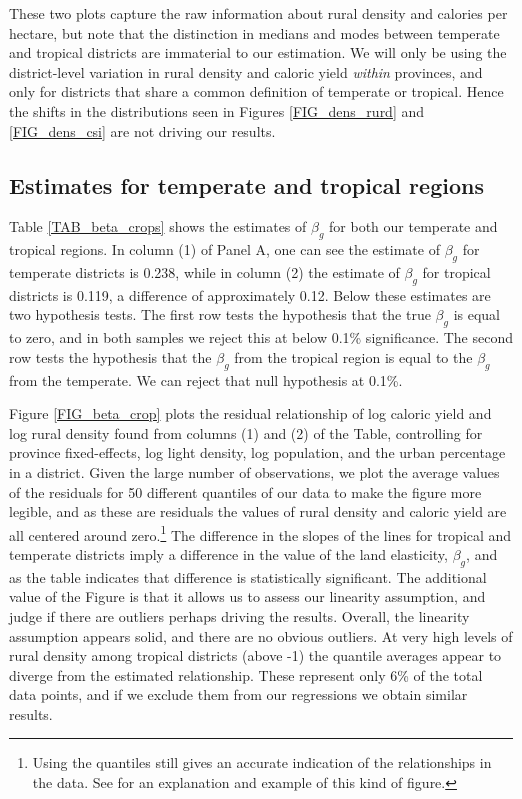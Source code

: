 \documentclass[11pt]{article}
\begin{document}
These two plots capture the raw information about rural density and calories per hectare, but note that the distinction in medians and modes between temperate and tropical districts are immaterial to our estimation. We will only be using the district-level variation in rural density and caloric yield \textit{within} provinces, and only for districts that share a common definition of temperate or tropical. Hence the shifts in the distributions seen in Figures \ref{FIG_dens_rurd} and \ref{FIG_dens_csi} are not driving our results. 

\subsection{Estimates for temperate and tropical regions}
Table \ref{TAB_beta_crops} shows the estimates of $\beta_g$ for both our temperate and tropical regions. In column (1) of Panel A, one can see the estimate of $\beta_g$ for temperate districts is 0.238, while in column (2) the estimate of $\beta_g$ for tropical districts is 0.119, a difference of approximately 0.12. Below these estimates are two hypothesis tests. The first row tests the hypothesis that the true $\beta_g$ is equal to zero, and in both samples we reject this at below 0.1\% significance. The second row tests the hypothesis that the $\beta_g$ from the tropical region is equal to the $\beta_g$ from the temperate. We can reject that null hypothesis at 0.1\%.

Figure \ref{FIG_beta_crop} plots the residual relationship of log caloric yield and log rural density found from columns (1) and (2) of the Table, controlling for province fixed-effects, log light density, log population, and the urban percentage in a district. Given the large number of observations, we plot the average values of the residuals for 50 different quantiles of our data to make the figure more legible, and as these are residuals the values of rural density and caloric yield are all centered around zero.\footnote{Using the quantiles still gives an accurate indication of the relationships in the data. See \citet{cfs2013} for an explanation and example of this kind of figure.} The difference in the slopes of the lines for tropical and temperate districts imply a difference in the value of the land elasticity, $\beta_g$, and as the table indicates that difference is statistically significant. The additional value of the Figure is that it allows us to assess our linearity assumption, and judge if there are outliers perhaps driving the results. Overall, the linearity assumption appears solid, and there are no obvious outliers. At very high levels of rural density among tropical districts (above -1) the quantile averages appear to diverge from the estimated relationship. These represent only 6\% of the total data points, and if we exclude them from our regressions we obtain similar results.
\end{document}
